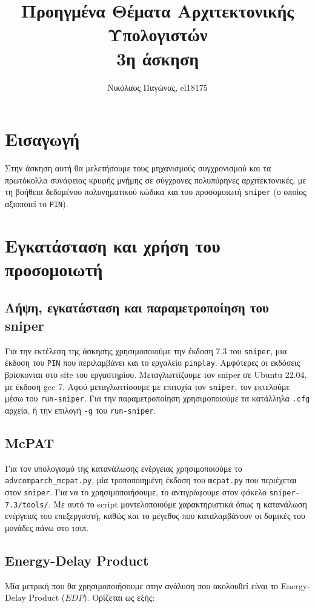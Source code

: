 \documentclass[12pt,a4paper]{article}
\title{Προηγμένα Θέματα Αρχιτεκτονικής Υπολογιστών \\ 3η άσκηση}
\author{Νικόλαος Παγώνας, el18175}
\date{}
\begin{document}
	\maketitle	
	
	\section{Εισαγωγή}
		Στην άσκηση αυτή θα μελετήσουμε τους μηχανισμούς συγχρονισμού και τα πρωτόκολλα συνάφειας κρυφής μνήμης σε σύγχρονες πολυπύρηνες αρχιτεκτονικές, με τη βοήθεια δεδομένου πολυνηματικού κώδικα και του προσομοιωτή \verb|sniper| (ο οποίος αξιοποιεί το \verb|PIN|). 
		
	\section{Εγκατάσταση και χρήση του προσομοιωτή}	
		
		\subsection{Λήψη, εγκατάσταση και παραμετροποίηση του sniper}
			Για την εκτέλεση της άσκησης χρησιμοποιούμε την έκδοση 7.3 του \verb|sniper|, μια έκδοση του \verb|PIN| που περιλαμβάνει και το εργαλείο \verb|pinplay|. Αμφότερες οι εκδόσεις βρίσκονται στο site του εργαστηρίου. Μεταγλωττίζουμε τον sniper σε Ubuntu 22.04, με έκδοση gcc 7. Αφού μεταγλωττίσουμε με επιτυχία τον \verb|sniper|, τον εκτελούμε μέσω του \verb|run-sniper|. Για την παραμετροποίηση χρησιμοποιούμε τα κατάλληλα \verb|.cfg| αρχεία, ή την επιλογή \verb|-g| του \verb|run-sniper|.			
					
		\subsection{McPAT}
			Για τον υπολογισμό της κατανάλωσης ενέργειας χρησιμοποιούμε το \verb|advcomparch_mcpat.py|, μία τροποποιημένη έκδοση του \verb|mcpat.py| που περιέχεται στον \verb|sniper|. Για να το χρησιμοποιήσουμε, το αντιγράφουμε στον φάκελο \verb|sniper-7.3/tools/|. Με αυτό το script μοντελοποιούμε χαρακτηριστικά όπως η κατανάλωση ενέργειας του επεξεργαστή, καθώς και το μέγεθος που καταλαμβάνουν οι δομικές του μονάδες πάνω στο τσιπ.
		
		\subsection{Energy-Delay Product}
			Μία μετρική που θα χρησιμοποιήσουμε στην ανάλυση που ακολουθεί είναι το Energy-Delay Product ($ EDP $). Ορίζεται ως εξής:
			
\end{document}
